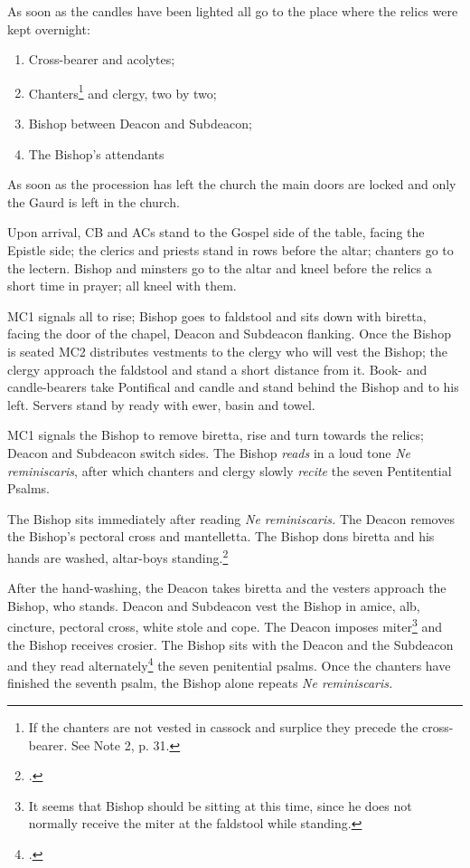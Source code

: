 \documentclass[letterpaper]{report}
\begin{document}
{\rubric As soon as the candles have been lighted all go to the place where the
relics were kept overnight:

\begin{enumerate}

    \item Cross-bearer and acolytes;

    \item Chanters\footnote{If the chanters are not vested in cassock and
        surplice they precede the cross-bearer. See \cite{consecranda} Note 2,
        p. 31.} and clergy, two by two;

    \item Bishop between Deacon and Subdeacon;

    \item The Bishop's attendants

\end{enumerate}

As soon as the procession has left the church the main doors are locked and
only the Gaurd is left in the church.

\rubric Upon arrival, CB and ACs stand to the Gospel side of the table, facing
the Epistle side; the clerics and priests stand in rows before the altar;
chanters go to the lectern. Bishop and minsters go to the altar and kneel before the
relics a short time in prayer; all kneel with them.

\rubric MC1 signals all to rise; Bishop goes to faldstool and sits down with
biretta, facing the door of the chapel, Deacon and Subdeacon flanking. Once
the Bishop is seated MC2 distributes vestments to the clergy who will vest the
Bishop; the clergy approach the faldstool and stand a short distance from it.
Book- and candle-bearers take Pontifical and candle and stand behind the Bishop
and to his left. Servers stand by ready with ewer, basin and towel.

\rubric MC1 signals the Bishop to remove biretta, rise and turn towards the
relics; Deacon and Subdeacon switch sides. The Bishop \textit{reads} in a loud tone
\textit{Ne reminiscaris}, after which chanters and clergy slowly
\textit{recite} the seven Pentitential Psalms.

\rubric The Bishop sits immediately after reading \textit{Ne reminiscaris.} The
Deacon removes the Bishop's pectoral cross and mantelletta. The Bishop dons
biretta and his hands are washed, altar-boys standing.\footcite[See][note 1, p.
39.]{consecranda}

\rubric After the hand-washing, the Deacon takes biretta and the vesters
approach the Bishop, who stands. Deacon and Subdeacon vest the Bishop in amice,
alb, cincture, pectoral cross, white stole and cope. The Deacon imposes
miter\footnote{It seems that Bishop should be sitting at this time, since he
does not normally receive the miter at the faldstool while standing.} and the
Bishop receives crosier. The Bishop sits with the Deacon and the Subdeacon and
they read alternately\footcite[The bishop usually reads the first verse of each
psalm and recites the verse \textit{Gloria Patri.}][note 3, p.
39.]{consecranda} the seven penitential psalms. Once the chanters have finished
the seventh psalm, the Bishop alone repeats \textit{Ne reminiscaris.}

}
\end{document}
